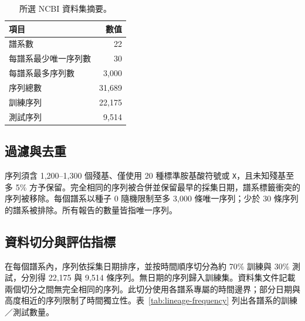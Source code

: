 \documentclass[10pt,a4paper]{article}
\begin{document}
\begin{table}[ht]
    \centering
    \caption{所選 NCBI 資料集摘要。}
    \label{tab:dataset-summary}
    \footnotesize
    \setlength{\tabcolsep}{6pt}
    \renewcommand{\arraystretch}{1.2}
    \begin{tabular*}{0.48\textwidth}{@{\extracolsep{\fill}}lr@{}}
        \toprule
        項目 & 數值 \\
        \midrule
        譜系數 & 22 \\
        每譜系最少唯一序列數 & 30 \\
        每譜系最多序列數 & 3,000 \\
        序列總數 & 31,689 \\
        訓練序列 & 22,175 \\
        測試序列 & 9,514 \\
        \bottomrule
    \end{tabular*}
\end{table}

\subsection{過濾與去重}

序列須含 1,200--1,300 個殘基、僅使用 20 種標準胺基酸符號或 \texttt{X}，且未知殘基至多 5\% 方予保留。完全相同的序列被合併並保留最早的採集日期，譜系標籤衝突的序列被移除。每個譜系以種子 0 隨機限制至多 3,000 條唯一序列；少於 30 條序列的譜系被排除。所有報告的數量皆指唯一序列。

\subsection{資料切分與評估指標}

在每個譜系內，序列依採集日期排序，並按時間順序切分為約 70\% 訓練與 30\% 測試，分別得 22,175 與 9,514 條序列。無日期的序列歸入訓練集。資料集文件記載兩個切分之間無完全相同的序列。此切分使用各譜系專屬的時間邊界；部分日期與高度相近的序列限制了時間獨立性。表~\ref{tab:lineage-frequency} 列出各譜系的訓練／測試數量。
\end{document}
